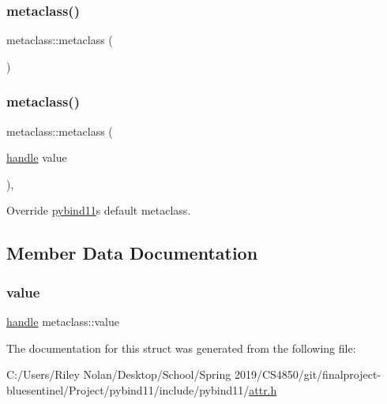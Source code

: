 \subsubsection{\texorpdfstring{metaclass()}{metaclass()}\hspace{0.1cm}{\footnotesize\ttfamily [1/2]}}
{\footnotesize\ttfamily metaclass\+::metaclass (\begin{DoxyParamCaption}{ }\end{DoxyParamCaption})\hspace{0.3cm}{\ttfamily [inline]}}

\mbox{\label{structmetaclass_a315277a15107c2eb0136076274cdcee9}} 
\subsubsection{\texorpdfstring{metaclass()}{metaclass()}\hspace{0.1cm}{\footnotesize\ttfamily [2/2]}}
{\footnotesize\ttfamily metaclass\+::metaclass (\begin{DoxyParamCaption}\item[{\mbox{\hyperlink{classhandle}{handle}}}]{value }\end{DoxyParamCaption})\hspace{0.3cm}{\ttfamily [inline]}, {\ttfamily [explicit]}}



Override \mbox{\hyperlink{namespacepybind11}{pybind11}}\textquotesingle{}s default metaclass. 



\subsection{Member Data Documentation}
\mbox{\label{structmetaclass_a19bbd12d205e469e2df2a7b4070cbdd4}} 
\subsubsection{\texorpdfstring{value}{value}}
{\footnotesize\ttfamily \mbox{\hyperlink{classhandle}{handle}} metaclass\+::value}



The documentation for this struct was generated from the following file\+:\begin{DoxyCompactItemize}
\item 
C\+:/\+Users/\+Riley Nolan/\+Desktop/\+School/\+Spring 2019/\+C\+S4850/git/finalproject-\/bluesentinel/\+Project/pybind11/include/pybind11/\mbox{\hyperlink{attr_8h}{attr.\+h}}\end{DoxyCompactItemize}
